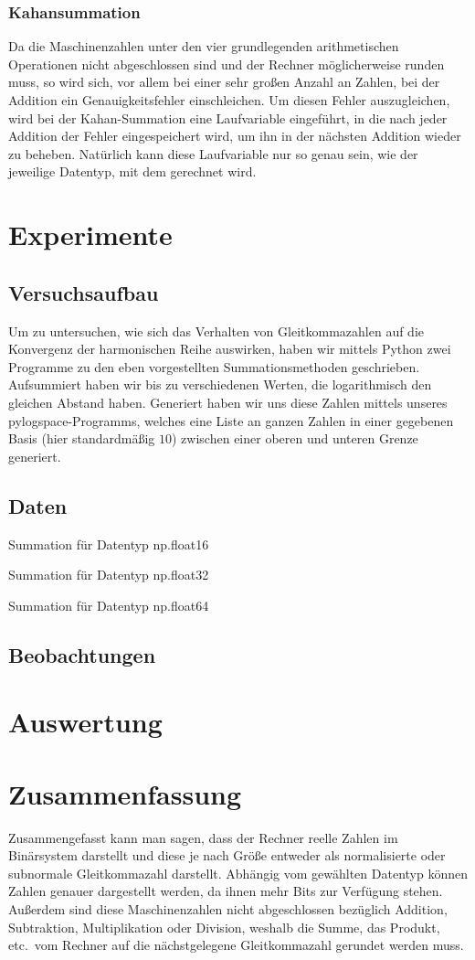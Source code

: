 \documentclass{scrartcl}
\begin{document}
\subsubsection{Kahansummation}
Da die Maschinenzahlen unter den vier grundlegenden arithmetischen Operationen
nicht abgeschlossen sind und der Rechner möglicherweise runden muss, so wird
sich, vor allem bei einer sehr großen Anzahl an Zahlen, bei der Addition ein
Genauigkeitsfehler einschleichen.
Um diesen Fehler auszugleichen, wird bei der Kahan-Summation eine Laufvariable
eingeführt, in die nach jeder Addition der Fehler eingespeichert wird, um ihn
in der nächsten Addition wieder zu beheben.
Natürlich kann diese Laufvariable nur so genau sein, wie der jeweilige
Datentyp, mit dem gerechnet wird.

\section{Experimente}
\subsection{Versuchsaufbau}
Um zu untersuchen, wie sich das Verhalten von Gleitkommazahlen auf die
Konvergenz der harmonischen Reihe auswirken, haben wir mittels Python zwei
Programme zu den eben vorgestellten Summationsmethoden geschrieben.
Aufsummiert haben wir bis zu verschiedenen Werten, die logarithmisch den
gleichen Abstand haben.
Generiert haben wir uns diese Zahlen mittels unseres pylogspace-Programms,
welches eine Liste an ganzen Zahlen in einer gegebenen Basis (hier
standardmäßig \(10\)) zwischen einer oberen und unteren Grenze generiert.

\subsection{Daten}
Summation für Datentyp np.float16

Summation für Datentyp
np.float32

Summation für Datentyp np.float64

\subsection{Beobachtungen}

\section{Auswertung}

\section{Zusammenfassung}
Zusammengefasst kann man sagen, dass der Rechner reelle Zahlen im Binärsystem
darstellt und diese je nach Größe entweder als normalisierte oder subnormale
Gleitkommazahl darstellt.
Abhängig vom gewählten Datentyp können Zahlen genauer dargestellt werden, da
ihnen mehr Bits zur Verfügung stehen.
Außerdem sind diese Maschinenzahlen nicht abgeschlossen bezüglich Addition,
Subtraktion, Multiplikation oder Division, weshalb die Summe, das Produkt,
etc.\ vom Rechner auf die nächstgelegene Gleitkommazahl gerundet werden muss.
\end{document}

